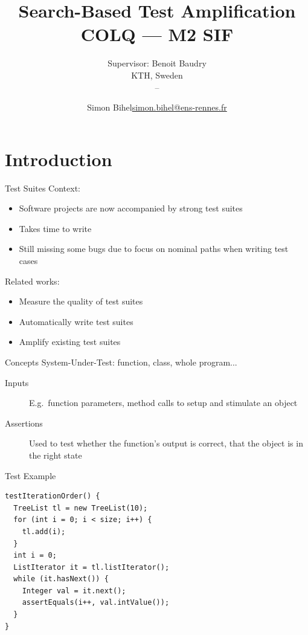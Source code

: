 \documentclass{beamer}
\title{Search-Based Test Amplification\\\large{COLQ --- M2 SIF}}
\subtitle{Supervisor: Benoit Baudry\\KTH, Sweden\\\displaydate{startdate} -- \displaydate{enddate}}
\date{\displaydate{defensedate}}
\author{%
  Simon Bihel\hfill\url{simon.bihel@ens-rennes.fr} \\
}
\institute{%
  University of Rennes I \\
  \'Ecole Normale Sup\'erieure de Rennes
}
\begin{document}
\maketitle

\section{Introduction}

\begin{frame}{Test Suites}
  Context:
  \begin{itemize}
    \item Software projects are now accompanied by strong test suites
    \item Takes time to write
    \item Still missing some bugs due to focus on nominal paths when writing test cases
  \end{itemize}

  \pause{}

  Related works:
  \begin{itemize}
    \item Measure the quality of test suites
    \item Automatically write test suites
    \item \alert{Amplify} existing test suites
  \end{itemize}
\end{frame}

\begin{frame}{Concepts}
  System-Under-Test: function, class, whole program...
  \begin{description}
    \item[Inputs] E.g.\ function parameters, method calls to setup and stimulate an object
    \item[Assertions] Used to test whether the function's output is correct, that the object is in the right state
  \end{description}
\end{frame}
\begin{frame}[fragile]{Test Example}
  \begin{verbatim}
testIterationOrder() {
  TreeList tl = new TreeList(10);
  for (int i = 0; i < size; i++) {
    tl.add(i);
  }
  int i = 0;
  ListIterator it = tl.listIterator();
  while (it.hasNext()) {
    Integer val = it.next();
    assertEquals(i++, val.intValue());
  }
}
  \end{verbatim}
\end{frame}
\end{document}
